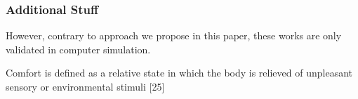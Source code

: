 





\subsubsection{Additional Stuff}
However, contrary to approach we propose in this paper, these works are only validated in computer simulation.

Comfort is defined as a relative state in which the body is relieved of unpleasant sensory or environmental stimuli [25]